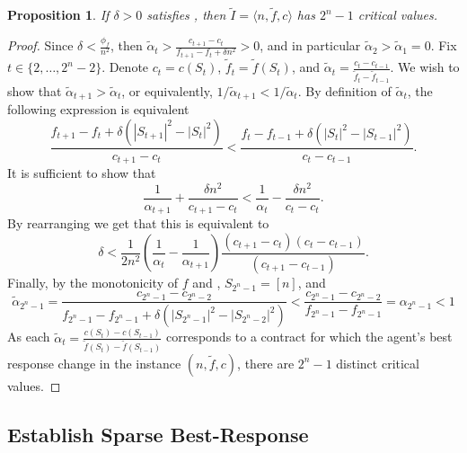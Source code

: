 \documentclass[11pt]{article}
\newtheorem{proposition}{Proposition}
\newcommand{\inst}[3]{\langle #1, #2, #3 \rangle}
\newcommand{\tf}{\tilde{f}}
\newcommand{\talpha}{\tilde{\alpha}}
\newcommand{\tI}{\tilde{I}}
\newcommand{\InstFTildeI}{\tI = \inst{n}{\tf}{c}}
\begin{document}
\begin{proposition}\label{prop:tf_exp_many_cvs}
If $\delta > 0$ satisfies , then $\InstFTildeI$ has $2^n-1$ critical values.
\end{proposition}


\begin{proof}
Since $\delta < \frac{\phi_f}{n^2}$, then $\talpha_t > \frac{c_{t+1}-c_t}{f_{t+1} - f_t + \delta n^2} > 0$, and in particular $\talpha_2 > \talpha_1 = 0$.
Fix $t\in \{2,\dots,2^n-2\}$. Denote $c_t = c(S_t)$, $\tf_t=\tf(S_t)$, and $\talpha_t = \frac{c_t-c_{t-1}}{\tf_t-\tf_{t-1}}$.
We wish to show that $\talpha_{t+1} > \talpha_t$, or equivalently, $1/{\talpha_{t+1}} < 1/{\talpha_t}$. 
By definition of $\talpha_t$, the following expression is equivalent
$$
\frac{f_{t+1} - f_t + \delta(|S_{t+1}|^2-|S_t|^2)}{c_{t+1} - c_t }
<
\frac{f_{t} - f_{t-1} + \delta(|S_{t}|^2-|S_{t-1}|^2)}{c_{t} - c_{t-1}}.
$$
It is sufficient to show that
$$
\frac{1}{\alpha_{t+1}}+ \frac{\delta n^2}{c_{t+1}-c_t} < \frac{1}{\alpha_{t}} - \frac{\delta n^2}{c_{t}-c_t}.
$$
By rearranging we get that this is equivalent to 
$$
\delta < \frac{1}{2n^2}\left(\frac{1}{\alpha_t}-\frac{1}{\alpha_{t+1}}\right)\frac{(c_{t+1}-c_{t})(c_{t}-c_{t-1})}{(c_{t+1}-c_{t-1})}.
$$
Finally, by the monotonicity of $f$ and , $S_{2^n-1}=[n]$, and
$$
\talpha_{2^n-1} = \frac{c_{2^n-1}-c_{2^n-2}}{f_{2^n-1}-f_{2^n-1}+\delta(|S_{2^n-1}|^2-|S_{2^n-2}|^2)} < \frac{c_{2^n-1}-c_{2^n-2}}{f_{2^n-1}-f_{2^n-1}} = \alpha_{2^n-1} <1
$$
As each $\talpha_t = \frac{c(S_t)-c(S_{t-1})}{\tf(S_t)-\tf(S_{t-1})}$ corresponds to a contract for which the agent's best response change in the instance $(n,\tf,c)$, there are $2^n-1$ distinct critical values.
\end{proof}
    
\subsection{Establish Sparse Best-Response}
\end{document}
